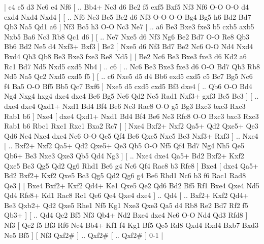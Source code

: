 \makegametitle 
|   c4   e5    d3   Nc6    e4   Nf6 [ .. Bb4+  Nc3 d6  Be2 f5  exf5 Bxf5  Nf3 Nf6  O-O O-O  d4 exd4  Nxd4 Nxd4   ]  [ .. Nf6  Nc3 Bc5  Be2 d6  Nf3 O-O  O-O Bg4  Bg5 h6  Bd2 Bd7  Qb3 Na5  Qd1 a6   ]  Nf3   Bc5    h3   O-O    Nc3   Ne7 [ .. a6  Be3 Bxe3  fxe3 b5  cxb5 axb5  Nxb5 Ba6  Nc3 Rb8  Qc1 d6   ]  [ .. Ne7  Nxe5 d6  Nf3 Ng6  Be2 Bd7  O-O Re8  Qb3 Bb6  Bd2 Ne5  d4 Nxf3+  Bxf3   ]  Be2 [  Nxe5 d6  Nf3 Bd7  Be2 Nc6  O-O Nd4  Nxd4 Bxd4  Qb3 Qb8  Be3 Bxe3  fxe3 Re8  Nd5   ]  [  Be2 Nc6  Be3 Bxe3  fxe3 d6  Kd2 a6  Rc1 Bd7  Nd5 Nxd5  cxd5 Nb4   ] .. c6 [ .. Nc6  Be3 Bxe3  fxe3 d6  O-O Bd7  Qb3 Rb8  Nd5 Na5  Qc2 Nxd5  cxd5 f5   ]  [ .. c6  Nxe5 d5  d4 Bb6  exd5 cxd5  c5 Bc7  Bg5 Nc6  f4 Ba5  O-O Bf5  Bb5 Qc7  Bxf6   ]  Nxe5   d5    cxd5   cxd5    Bf3   dxe4    [ .. Qb6  O-O Bd4  Ng4 Nxg4  hxg4 dxe4  dxe4 Be6  Bg5 Nc6  Qd2 Ne5  Rad1 Nxf3+  gxf3 Be5  Be3   ]  [ .. dxe4  dxe4 Qxd1+  Nxd1 Bd4  Bf4 Be6  Nc3 Rac8  O-O g5  Bg3 Bxc3  bxc3 Rxc3  Rab1 b6   ]  Nxe4 [  dxe4 Qxd1+  Nxd1 Bd4  Bf4 Be6  Nc3 Rfc8  O-O Bxc3  bxc3 Rxc3  Rab1 b6  Rbc1 Rxc1  Rxc1 Bxa2  Rc7   ]  [  Nxe4 Bxf2+  Nxf2 Qa5+  Qd2 Qxe5+  Qe3 Qd6  Ne4 Nxe4  dxe4 Nc6  O-O Qe5  Qf4 Be6  Qxe5 Nxe5  Be3 Nxf3+  Rxf3   ] .. Nxe4 [ .. Bxf2+  Nxf2 Qa5+  Qd2 Qxe5+  Qe3 Qb5  O-O Nf5  Qf4 Bd7  Ng4 Nh5  Qe5 Qb6+  Be3 Nxe3  Qxe3 Qb5  Qd4 Ng3   ]  [ .. Nxe4  dxe4 Qa5+  Bd2 Bxf2+  Kxf2 Qxe5  Bc3 Qg5  Qd2 Qg6  Rhd1 Be6  g4 Nc6  Qf4 Rac8  b3 Rfe8   ]  Bxe4 [  dxe4 Qa5+  Bd2 Bxf2+  Kxf2 Qxe5  Bc3 Qg5  Qd2 Qg6  g4 Be6  Rhd1 Nc6  b3 f6  Rac1 Rad8  Qe3   ]  [  Bxe4 Bxf2+  Kxf2 Qd4+  Ke1 Qxe5  Qe2 Qd6  Bd2 Bf5  Rf1 Bxe4  Qxe4 Nd5  Qd4 Rfe8+  Kd1 Rac8  Rc1 Qe6  Qe4 Qxe4  dxe4   ] .. Qd4 [ .. Bxf2+  Kxf2 Qd4+  Be3 Qxb2+  Qd2 Qxe5  Rhe1 Nf5  Kg1 Nxe3  Qxe3 Qa5  d4 Rb8  Re2 Bd7  Rf2 f5  Qb3+   ]  [ .. Qd4  Qe2 Bf5  Nf3 Qb4+  Nd2 Bxe4  dxe4 Nc6  O-O Nd4  Qd3 Rfd8   ]  Nf3 [  Qe2 f5  Bf3 Rf6  Nc4 Bb4+  Kf1 f4  Kg1 Bf5  Qe5 Rd8  Qxd4 Rxd4  Bxb7 Bxd3  Ne5 Bf5   ]  [  Nf3 Qxf2#   ] .. Qxf2#    [ .. Qxf2#   ] 0-1  |
